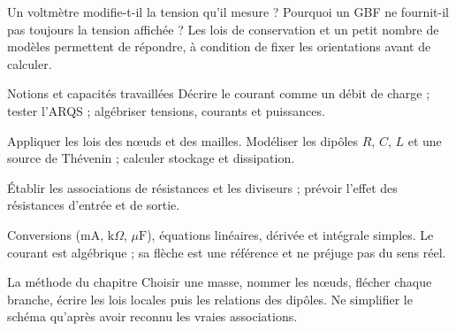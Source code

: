 Un voltmètre modifie-t-il la tension qu’il mesure ? Pourquoi un GBF ne fournit-il pas toujours la tension affichée ? Les lois de conservation et un petit nombre de modèles permettent de répondre, à condition de fixer les orientations avant de calculer.
\begin{loi}{Notions et capacités travaillées}
Décrire le courant comme un débit de charge ; tester l’ARQS ; algébriser tensions, courants et puissances.\par Appliquer les lois des nœuds et des mailles. Modéliser les dipôles $R$, $C$, $L$ et une source de Thévenin ; calculer stockage et dissipation.\par Établir les associations de résistances et les diviseurs ; prévoir l’effet des résistances d’entrée et de sortie.
\end{loi}

Conversions ($\mathrm{mA}$, $\mathrm{k}\Omega$, $\mu\mathrm{ F}$), équations linéaires, dérivée et intégrale simples. Le courant est algébrique ; sa flèche est une référence et ne préjuge pas du sens réel.

\begin{methode}{La méthode du chapitre}
Choisir une masse, nommer les nœuds, flécher chaque branche, écrire les lois locales puis les relations des dipôles. Ne simplifier le schéma qu’après avoir reconnu les vraies associations.
\end{methode}


